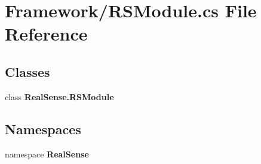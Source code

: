 \section{Framework/\+R\+S\+Module.cs File Reference}
\label{_r_s_module_8cs}
\subsection*{Classes}
\begin{DoxyCompactItemize}
\item 
class \textbf{ Real\+Sense.\+R\+S\+Module}
\end{DoxyCompactItemize}
\subsection*{Namespaces}
\begin{DoxyCompactItemize}
\item 
namespace \textbf{ Real\+Sense}
\end{DoxyCompactItemize}
